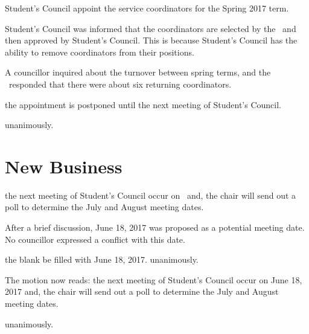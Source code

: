 \documentclass[12pt, letterpaper]{article}
\begin{document}
\begin{motion}
    \birt Student's Council appoint the service coordinators for the Spring 2017 term. 
    \movers{\jill}{\brian}

    Student's Council was informed that the coordinators are selected by the 
    \vpi\ and then approved by Student's Council. This is because Student's
    Council has the ability to remove coordinators from their positions. 

    A councillor inquired about the turnover between spring terms, and the 
    \vpi\ responded that there were about six returning coordinators. 

    \birt the appointment is postponed until the next meeting of Student's
    Council.
    \movers{\antonio}{\ben}

    \carries unanimously. 
\end{motion}

\section*{New Business}

\begin{motion}
    \birt the next meeting of Student's Council occur on \blank\ and,
    \bifrt the chair will send out a poll to determine the July and August meeting
    dates. 
    \movers{\brian}{\jason}

    After a brief discussion, June 18, 2017 was proposed as a potential meeting
    date. No councillor expressed a conflict with this date. 

    \birt the blank be filled with June 18, 2017. 
    \movers{\brian}{\jason}
    \carries unanimously. 

    The motion now reads: 
    \birt the next meeting of Student's Council occur on June 18, 2017 and,
    \bifrt the chair will send out a poll to determine the July and August meeting
    dates. 

    \carries unanimously. 
\end{motion}
\end{document}
